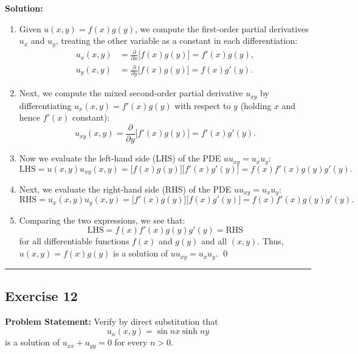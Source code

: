\documentclass[11pt,a4paper]{article}
\begin{document}
\textbf{Solution:}
\begin{enumerate}
    \item Given $u(x, y) = f(x)g(y)$, we compute the first-order partial derivatives $u_x$ and $u_y$, treating the other variable as a constant in each differentiation:
    \begin{align*}
        u_x(x, y) &= \frac{\partial}{\partial x}\big[f(x)g(y)\big] = f'(x)g(y), \\
        u_y(x, y) &= \frac{\partial}{\partial y}\big[f(x)g(y)\big] = f(x)g'(y).
    \end{align*}
    \item Next, we compute the mixed second-order partial derivative $u_{xy}$ by differentiating $u_x(x, y) = f'(x)g(y)$ with respect to $y$ (holding $x$ and hence $f'(x)$ constant):
    \[
        u_{xy}(x, y) = \frac{\partial}{\partial y}\big[f'(x)g(y)\big] = f'(x)g'(y).
    \]
    \item Now we evaluate the left-hand side (LHS) of the PDE $u u_{xy} = u_x u_y$:
    \[
        \text{LHS} = u(x, y) u_{xy}(x, y) = \big[f(x)g(y)\big]\big[f'(x)g'(y)\big] = f(x)f'(x)g(y)g'(y).
    \]
    \item Next, we evaluate the right-hand side (RHS) of the PDE $u u_{xy} = u_x u_y$:
    \[
        \text{RHS} = u_x(x, y) u_y(x, y) = \big[f'(x)g(y)\big]\big[f(x)g'(y)\big] = f(x)f'(x)g(y)g'(y).
    \]
    \item Comparing the two expressions, we see that:
    \[
        \text{LHS} = f(x)f'(x)g(y)g'(y) = \text{RHS}
    \]
    for all differentiable functions $f(x)$ and $g(y)$ and all $(x, y)$. Thus, $u(x, y) = f(x)g(y)$ is a solution of $u u_{xy} = u_x u_y$. \qed
\end{enumerate}

\bigskip
\hrule
\bigskip

\subsection*{Exercise 12}
\textbf{Problem Statement:} Verify by direct substitution that
\[
    u_n(x, y) = \sin nx \sinh ny
\]
is a solution of $u_{xx} + u_{yy} = 0$ for every $n > 0$.
\end{document}
